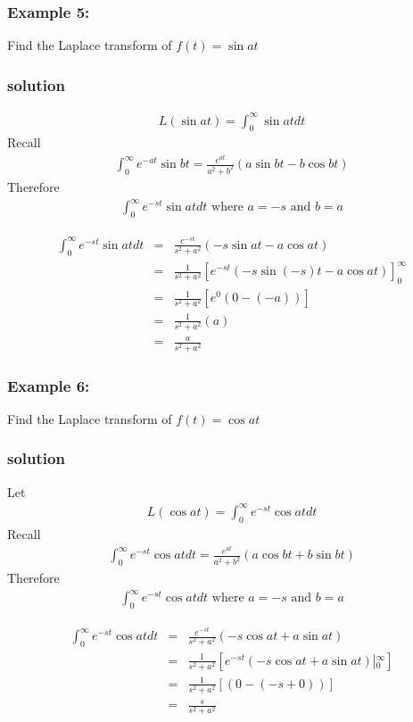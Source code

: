 \documentclass[12pt]{report}
\begin{document}
\subsubsection{Example 5:}
Find the Laplace transform of $f(t)=\sin at$

\subsubsection{solution}
\begin{align*}
L(\sin at)= \int_0^\infty \sin at dt
\end{align*}
Recall
\begin{align*}
\int_0^\infty e^{-at} \sin bt = \frac{e^{at}}{a^2+b^2}(a \sin bt - b\cos bt)
\end{align*}
Therefore
\begin{align*}
\int_0^\infty e^{-st}\sin at dt \mbox{ where } a=-s \mbox{ and } b=a
\end{align*}

\begin{eqnarray}
\int_0^\infty e^{-st}\sin at dt &= & \frac{e^{-st}}{s^2+a^2}(-s\sin at-a \cos at)\nonumber \\
&=& \frac{1}{s^2+a^2} \left[ e^{-st}(-s\sin (-s)t-a \cos at)\right]_0^\infty\nonumber \\
&=& \frac{1}{s^2+a^2} \left[ e^0(0-(-a))\right ] \nonumber \\
&=& \frac{1}{s^2+a^2}(a)\nonumber \\
&=& \frac{a}{s^2+a^2}
\end{eqnarray}
\subsubsection{Example 6:}
Find the Laplace transform of $f(t)=\cos at$
\subsubsection{solution}
Let
\begin{align*}
L(\cos at)= \int_0^\infty e^{-st}\cos at dt
\end{align*}
Recall
\begin{align*}
\int_0^\infty e^{-st} \cos at dt = \frac{e^{at}}{a^2+b^2}(a \cos bt+b\sin bt)
\end{align*}
Therefore
\begin{align*}
\int_0^\infty e^{-st}\cos at dt \mbox{ where } a=-s \mbox{ and } b=a
\end{align*}

\begin{eqnarray}
\int_0^\infty e^{-st}\cos at dt &= & \frac{e^{-st}}{s^2+a^2}(-s\cos at+a \sin at)\nonumber \\
&=& \frac{1}{s^2+a^2} \left[ e^{-st}(-s\cos at+a \sin at) \left|_0^\infty \right. \right] \nonumber\\
&=& \frac{1}{s^2+a^2} \left[(0-(-s+0))\right ] \nonumber \\
&=& \frac{s}{s^2+a^2}
\end{eqnarray}
\end{document}
